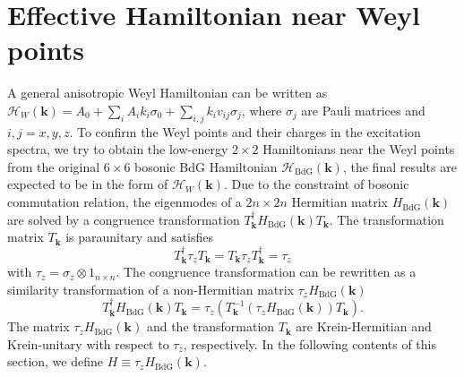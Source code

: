 \documentclass[aps,pra,floatfix,twocolumn,superscriptaddress]{revtex4-1}
\begin{document}
\section{Effective Hamiltonian near Weyl points}
\label{appendixA}
A general anisotropic Weyl Hamiltonian can be written as $\mathcal{H}_W(\mathbf{k})=A_0+\sum_iA_ik_i\sigma_0+\sum_{i,j}k_iv_{ij}\sigma_j$, where $\sigma_j$ are Pauli matrices and $i,j=x,y,z$. To confirm the Weyl points and their charges in the excitation spectra, we try to obtain the low-energy $2\times 2$ Hamiltonians near the Weyl points from the original $6\times 6$ bosonic BdG Hamiltonian $\mathcal{H}_\mathrm{BdG}(\mathbf{k})$, the final results are expected to be in the form of $\mathcal{H}_W(\mathbf{k})$. Due to the constraint of bosonic commutation relation, the eigenmodes of a $2n\times 2n$ Hermitian matrix $H_\mathrm{BdG}(\mathbf{k})$ are solved by a congruence transformation $T_\mathbf{k}^\dagger H_\mathrm{BdG}(\mathbf{k})T_\mathbf{k}$. The transformation matrix $T_\mathbf{k}$ is paraunitary and satisfies
\begin{equation}
	T^\dagger_\mathbf{k} \tau_zT_\mathbf{k}=T_\mathbf{k}\tau_zT^\dagger_\mathbf{k}=\tau_z
\end{equation}
with $\tau_z=\sigma_z\otimes 1_{n\times n}$. The congruence transformation can be rewritten as a similarity transformation of a non-Hermitian matrix $\tau_z H_\mathrm{BdG}(\mathbf{k})$
\begin{equation}
	T_\mathbf{k}^\dagger H_\mathrm{BdG}(\mathbf{k})T_\mathbf{k}=\tau_z (T_\mathbf{k}^{-1}(\tau_z H_\mathrm{BdG}(\mathbf{k}))T_\mathbf{k}).
\end{equation}
The matrix $\tau_z H_\mathrm{BdG}(\mathbf{k})$ and the transformation $T_\mathbf{k}$ are Krein-Hermitian and Krein-unitary with respect to $\tau_z$, respectively. In the following contents of this section, we define $H\equiv\tau_zH_\mathrm{BdG}(\mathbf{k})$.
\end{document}
